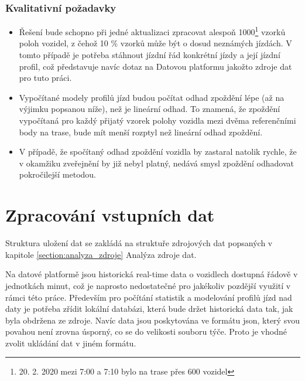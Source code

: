 \subsubsection{Kvalitativní požadavky} \label{subsubsection:kvalitativni_pozadavky}


\begin{itemize}


\item
Řešení bude schopno při jedné aktualizaci zpracovat alespoň 1000\footnote{20. 2. 2020 mezi 7:00 a 7:10 bylo na trase přes 600 vozidel} vzorků poloh vozidel, z čehož 10 \% vzorků může být o dosud neznámých jízdách. V tomto případě je potřeba stáhnout jízdní řád konkrétní jízdy a její jízdní profil, což představuje navíc dotaz na Datovou platformu jakožto zdroje dat pro tuto práci.


\item
Vypočítané modely profilů jízd budou počítat odhad zpoždění lépe (až na výjimku popsanou níže), než je lineární odhad. To znamená, že zpoždění vypočítaná pro každý přijatý vzorek polohy vozidla mezi dvěma referenčními body na trase, bude mít menší rozptyl než lineární odhad zpoždění.


\item
V případě, že spočítaný odhad zpoždění vozidla by zastaral natolik rychle, že v okamžiku zveřejnění by již nebyl platný, nedává smysl zpoždění odhadovat pokročilejší metodou.


\end{itemize}




\section{Zpracování vstupních dat} \label{section:zpracovani_vstupnich_dat}


Struktura uložení dat se zakládá na struktuře zdrojových dat popsaných v kapitole \ref{section:analyza_zdroje} Analýza zdroje dat.


\bigbreak


Na datové platformě jsou historická real-time data o vozidlech dostupná řádově v jednotkách minut, což je naprosto nedostatečné pro jakékoliv pozdější využití v rámci této práce. Především pro počítání statistik a modelování profilů jízd nad daty je potřeba zřídit lokální databázi, která bude držet historická data tak, jak byla obdržena ze zdroje. Navíc data jsou poskytována ve formátu \gls{json}, který svou povahou není zrovna úsporný, co se do velikosti souboru týče. Proto je vhodné zvolit ukládání dat v jiném formátu.



